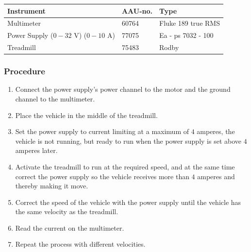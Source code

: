 \begin{table}[H]
\begin{tabular}{|l|l|p{4cm}|}
\hline%
  \textbf{Instrument}                       &  \textbf{AAU-no.}  &  \textbf{Type}         \\
\hline%
  Multimeter                                &  60764             &  Fluke 189 true RMS    \\
\hline%
  Power Supply ($0 - 32$ V) ($0 - 10$ A)    &  77075             &  Ea - ps 7032 - 100    \\
\hline%
  Treadmill                                 &  75483             &  Rodby                 \\
\hline%
\end{tabular}
\end{table}

\subsubsection{Procedure}

\begin{enumerate}
  \item Connect the power supply's power channel to the motor and the ground channel to the multimeter.
  \item Place the vehicle in the middle of the treadmill.
  \item Set the power supply to current limiting at a maximum of $4$ amperes, the vehicle is not running, but ready to run when the power supply is set above $4$ amperes later. 
  \item Activate the treadmill to run at the required speed, and at the same time correct the power supply so the vehicle receives more than $4$ amperes and thereby making it move.
  \item Correct the speed of the vehicle with the power supply until the vehicle has the same velocity as the treadmill.
  \item Read the current on the multimeter.
  \item Repeat the process with different velocities.
\end{enumerate}

